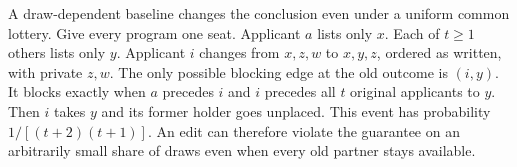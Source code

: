A draw-dependent baseline changes the conclusion even under a uniform common lottery. Give every program one seat. Applicant $a$ lists only $x$. Each of $t\ge1$ others lists only $y$. Applicant $i$ changes from $x,z,w$ to $x,y,z$, ordered as written, with private $z,w$. The only possible blocking edge at the old outcome is $(i,y)$. It blocks exactly when $a$ precedes $i$ and $i$ precedes all $t$ original applicants to $y$. Then $i$ takes $y$ and its former holder goes unplaced. This event has probability $1/[(t+2)(t+1)]$. An edit can therefore violate the guarantee on an arbitrarily small share of draws even when every old partner stays available.
